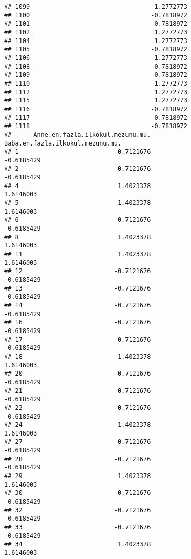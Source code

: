 \documentclass[
]{article}
\begin{document}
\begin{verbatim}
## 1099                                  1.2772773
## 1100                                 -0.7818972
## 1101                                 -0.7818972
## 1102                                  1.2772773
## 1104                                  1.2772773
## 1105                                 -0.7818972
## 1106                                  1.2772773
## 1108                                 -0.7818972
## 1109                                 -0.7818972
## 1110                                  1.2772773
## 1112                                  1.2772773
## 1115                                  1.2772773
## 1116                                 -0.7818972
## 1117                                 -0.7818972
## 1118                                 -0.7818972
##      Anne.en.fazla.ilkokul.mezunu.mu. Baba.en.fazla.ilkokul.mezunu.mu.
## 1                          -0.7121676                       -0.6185429
## 2                          -0.7121676                       -0.6185429
## 4                           1.4023378                        1.6146003
## 5                           1.4023378                        1.6146003
## 6                          -0.7121676                       -0.6185429
## 8                           1.4023378                        1.6146003
## 11                          1.4023378                        1.6146003
## 12                         -0.7121676                       -0.6185429
## 13                         -0.7121676                       -0.6185429
## 14                         -0.7121676                       -0.6185429
## 16                         -0.7121676                       -0.6185429
## 17                         -0.7121676                       -0.6185429
## 18                          1.4023378                        1.6146003
## 20                         -0.7121676                       -0.6185429
## 21                         -0.7121676                       -0.6185429
## 22                         -0.7121676                       -0.6185429
## 24                          1.4023378                        1.6146003
## 27                         -0.7121676                       -0.6185429
## 28                         -0.7121676                       -0.6185429
## 29                          1.4023378                        1.6146003
## 30                         -0.7121676                       -0.6185429
## 32                         -0.7121676                       -0.6185429
## 33                         -0.7121676                       -0.6185429
## 34                          1.4023378                        1.6146003

\end{verbatim}
\end{document}
